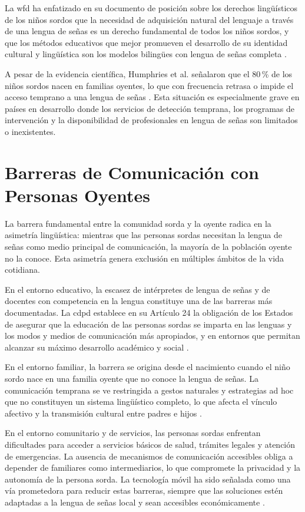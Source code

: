 La \acrshort{wfd} ha enfatizado en su documento de posición sobre los derechos lingüísticos de los
niños sordos que la necesidad de adquisición natural del lenguaje a través de una lengua
de señas es un derecho fundamental de todos los niños sordos, y que los métodos
educativos que mejor promueven el desarrollo de su identidad cultural y lingüística son los
modelos bilingües con lengua de señas completa \cite{wfd_language_rights_2016}.

A pesar de la evidencia científica, Humphries et al. señalaron que el 80\,\% de los niños
sordos nacen en familias oyentes, lo que con frecuencia retrasa o impide el acceso temprano
a una lengua de señas \cite{humphries_language_2012}. Esta situación es especialmente grave en países en desarrollo
donde los servicios de detección temprana, los programas de intervención y la disponibilidad
de profesionales en lengua de señas son limitados o inexistentes.

\section{Barreras de Comunicación con Personas Oyentes}

La barrera fundamental entre la comunidad sorda y la oyente radica en la asimetría
lingüística: mientras que las personas sordas necesitan la lengua de señas como medio
principal de comunicación, la mayoría de la población oyente no la conoce. Esta asimetría
genera exclusión en múltiples ámbitos de la vida cotidiana.

En el entorno educativo, la escasez de intérpretes de lengua de señas y de docentes con
competencia en la lengua constituye una de las barreras más documentadas. La \acrshort{cdpd}
establece en su Artículo 24 la obligación de los Estados de asegurar que la educación de
las personas sordas se imparta en las lenguas y los modos y medios de comunicación más
apropiados, y en entornos que permitan alcanzar su máximo desarrollo académico y
social \cite{onu_cdpd_2006}.

En el entorno familiar, la barrera se origina desde el nacimiento cuando el niño sordo nace
en una familia oyente que no conoce la lengua de señas. La comunicación temprana se ve
restringida a gestos naturales y estrategias ad hoc que no constituyen un sistema
lingüístico completo, lo que afecta el vínculo afectivo y la transmisión cultural entre padres
e hijos \cite{humphries_language_2012}.

En el entorno comunitario y de servicios, las personas sordas enfrentan dificultades para
acceder a servicios básicos de salud, trámites legales y atención de emergencias. La
ausencia de mecanismos de comunicación accesibles obliga a depender de familiares como
intermediarios, lo que compromete la privacidad y la autonomía de la persona sorda. La
tecnología móvil ha sido señalada como una vía prometedora para reducir estas barreras,
siempre que las soluciones estén adaptadas a la lengua de señas local y sean accesibles
económicamente \cite{who_world_report_2021}.

